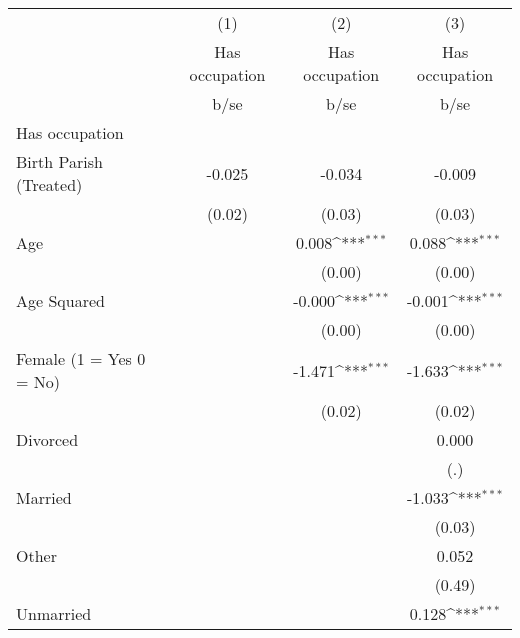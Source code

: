 {
\def\sym#1{\ifmmode^{#1}\else\(^{#1}\)\fi}
\begin{tabular}{l*{3}{c}}
\hline\hline
                    &\multicolumn{1}{c}{(1)}&\multicolumn{1}{c}{(2)}&\multicolumn{1}{c}{(3)}\\
                    &\multicolumn{1}{c}{Has occupation}&\multicolumn{1}{c}{Has occupation}&\multicolumn{1}{c}{Has occupation}\\
                    &        b/se         &        b/se         &        b/se         \\
\hline
Has occupation      &                     &                     &                     \\
Birth Parish (Treated)&      -0.025         &      -0.034         &      -0.009         \\
                    &      (0.02)         &      (0.03)         &      (0.03)         \\
Age                 &                     &       0.008\sym{***}&       0.088\sym{***}\\
                    &                     &      (0.00)         &      (0.00)         \\
Age Squared         &                     &      -0.000\sym{***}&      -0.001\sym{***}\\
                    &                     &      (0.00)         &      (0.00)         \\
Female (1 = Yes 0 = No)&                     &      -1.471\sym{***}&      -1.633\sym{***}\\
                    &                     &      (0.02)         &      (0.02)         \\
Divorced            &                     &                     &       0.000         \\
                    &                     &                     &         (.)         \\
Married             &                     &                     &      -1.033\sym{***}\\
                    &                     &                     &      (0.03)         \\
Other               &                     &                     &       0.052         \\
                    &                     &                     &      (0.49)         \\
Unmarried           &                     &                     &       0.128\sym{***}\\

\end{tabular}}
